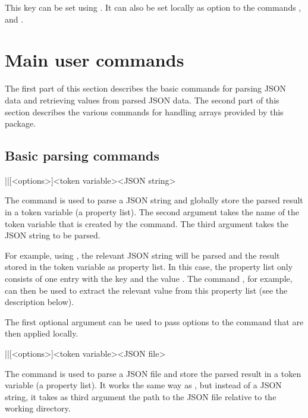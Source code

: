 \documentclass[a4paper]{article}
\begin{document}
{{This key can be set using \macro{\JSONParseSet}. It can also be set locally as option to the commands \macro{\JSONParseValue}, \macro{\JSONParseArrayUse} and \macro{\JSONParseArrayMapFunction}.

\section{Main user commands}

The first part of this section describes the basic commands for parsing JSON data and retrieving values from parsed JSON data. The second part of this section describes the various commands for handling arrays provided by this package.

\subsection{Basic parsing commands}

\begin{macrodef}
|\JSONParse|[<options>]{<token variable>}{<JSON string>}
\end{macrodef}
The command \macro{\JSONParse} is used to parse a JSON string and globally store the parsed result in a token variable (a property list). The second argument takes the name of the token variable that is created by the command. The third argument takes the JSON string to be parsed.

For example, using , the relevant JSON string will be parsed and the result stored in the token variable \macro{\myJSONdata} as property list. In this case, the property list only consists of one entry with the key  and the value . The command , for example, can then be used to extract the relevant value from this property list (see the description below).

The first optional argument can be used to pass options to the command that are then applied locally.

\begin{macrodef}
|\JSONParseFromFile|[<options>]{<token variable>}{<JSON file>}
\end{macrodef}
The command \macro{\JSONParseFromFile} is used to parse a JSON file and store the parsed result in a token variable (a property list). It works the same way as \macro{\JSONParse}, but instead of a JSON string, it takes as third argument the path to the JSON file relative to the working directory.

}}
\end{document}
